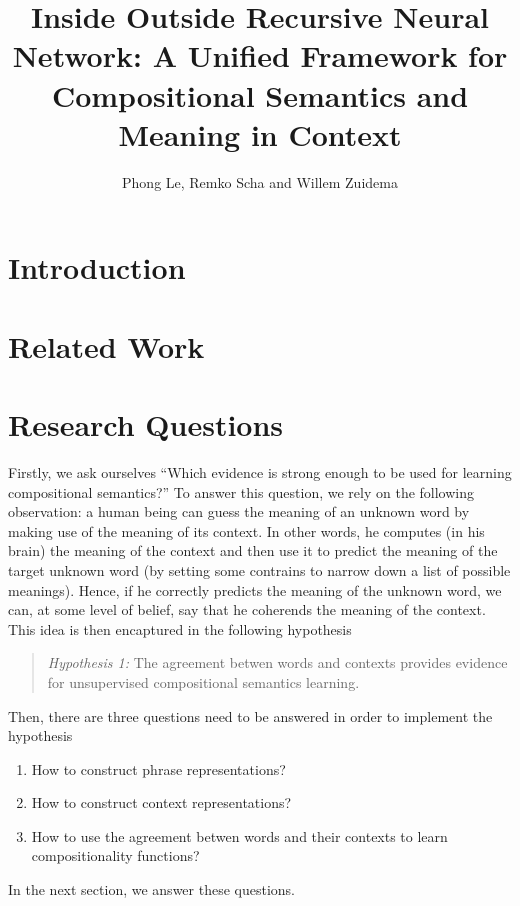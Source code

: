 \documentclass[11pt]{article}
\title{Inside Outside Recursive Neural Network: A Unified Framework for 
Compositional Semantics and Meaning in Context}
\author{Phong Le, Remko Scha and Willem Zuidema}
\begin{document}
\maketitle

\section{Introduction}
\label{section introduction}

\section{Related Work}
\label{section introduction}

\section{Research Questions}
\label{section question}

Firstly, we ask ourselves ``Which evidence is strong enough to be used for 
learning compositional semantics?'' To answer this question, we rely on the 
following observation: a human being can guess the meaning of an unknown 
word by making use of the meaning of its context. In other words, he computes 
(in his brain) the meaning of the context and then use it to predict the meaning 
of the target unknown word (by setting some contrains to narrow down a list of 
possible meanings). Hence, if he correctly predicts the meaning of the unknown word, 
we can, at some level of belief, say that he coherends the meaning of the context. 
This idea is then encaptured in the following hypothesis
\begin{quote}
\textit{Hypothesis 1:} The agreement betwen words and contexts provides evidence for unsupervised 
compositional semantics learning. 
\end{quote}

Then, there are three questions need to be answered in order to implement the 
hypothesis
\begin{enumerate}
	\item How to construct phrase representations?
	\item How to construct context representations?
	\item How to use the agreement betwen words and 
	their contexts to learn compositionality functions?
\end{enumerate}
In the next section, we answer these questions.
\end{document}
